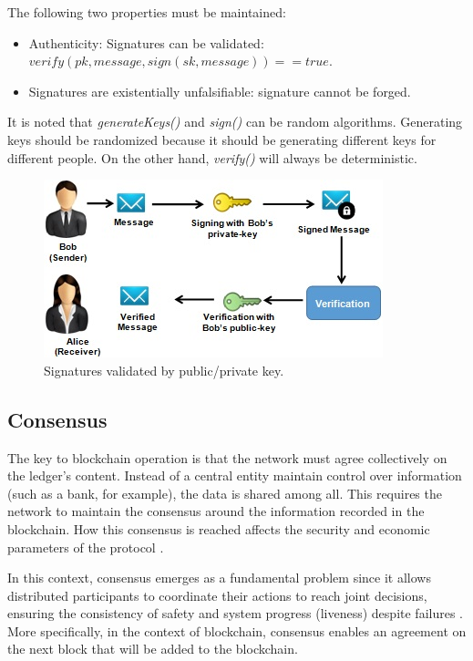 The following two properties must be maintained:

\begin{itemize}
\item Authenticity: Signatures can be validated: \\ $verify(pk, message, sign(sk, message)) = = true$.
\item Signatures are existentially unfalsifiable: signature cannot be forged.
\end{itemize}

It is noted that \textit{generateKeys()} and \textit{sign()} can be random algorithms. Generating keys should be randomized because it should be generating different keys for different people. On the other hand, \textit{verify()} will always be deterministic.

\begin{figure}[htbp]
\begin{center}
  \includegraphics[scale=1.0]{images/AliceBob.jpg}
\caption{Signatures validated by public/private key.}
\label{fig:authenticationExample}
\end{center}
\end{figure}

\subsection{Consensus}\label{sec:consenso}
The key to blockchain operation is that the network must agree collectively on the ledger's content.  Instead of a central entity maintain control over information (such as a bank, for example), the data is shared among all. This requires the network to maintain the consensus around the information recorded in the blockchain. How this consensus is reached affects the security and economic parameters of the protocol \cite{kostarev2017review}.

In this context, consensus emerges as a fundamental problem since it allows distributed participants to coordinate their actions to reach joint decisions, ensuring the consistency of safety and system progress (liveness) despite failures \cite{greve2018blockchain}. More specifically, in the context of blockchain, consensus enables an agreement on the next block that will be added to the blockchain.

